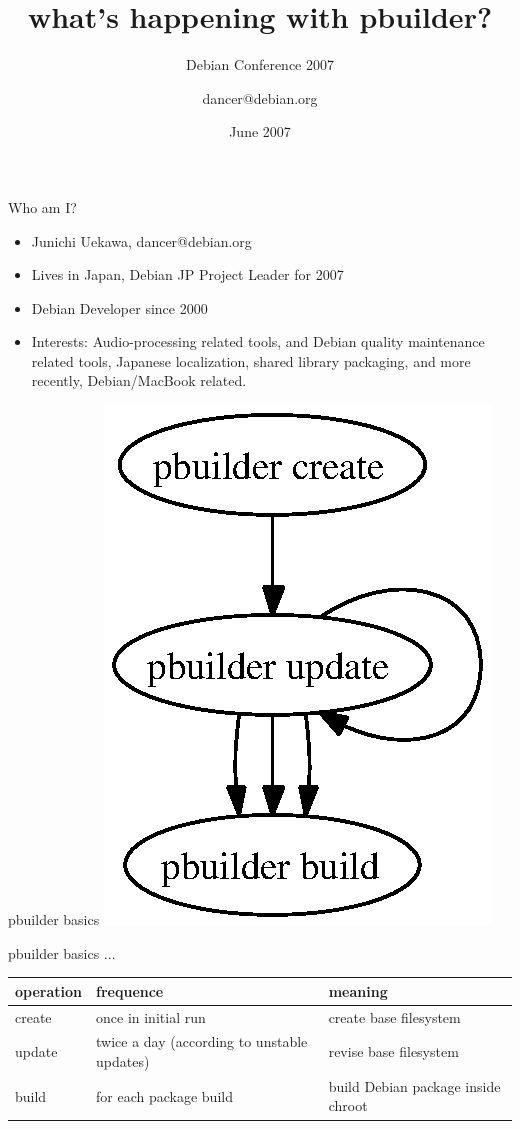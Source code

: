 \documentclass[dvipdfm,12pt]{beamer}
\title{what's happening with pbuilder?}
\subtitle{Debian Conference 2007}
\author{dancer@debian.org}
\date{June 2007}
\begin{document}
\frame{\titlepage{}}


\begin{frame}{Who am I?}
\begin{itemize}
 \item Junichi Uekawa, dancer@debian.org
 \item Lives in Japan, Debian JP Project Leader for 2007
 \item Debian Developer since 2000
 \item Interests: Audio-processing related tools, and 
       Debian quality maintenance related tools,
       Japanese localization, shared library packaging, 
       and more recently, Debian/MacBook related.
\end{itemize}
\end{frame}
 
\begin{frame}{pbuilder basics}
\includegraphics[height=0.7\vsize]{pbuildercycle.eps}
\end{frame}

\begin{frame}{pbuilder basics ...}
\begin{tabular}{|l|p{8em}|p{8em}|}
\hline
operation & frequence & meaning \\
\hline
create & once in initial run & create base filesystem \\
update & twice a day (according to unstable updates) & 
 revise base filesystem \\
build & for each package build & build Debian package inside chroot \\
\hline
\end{tabular}
\end{frame}
\end{document}
